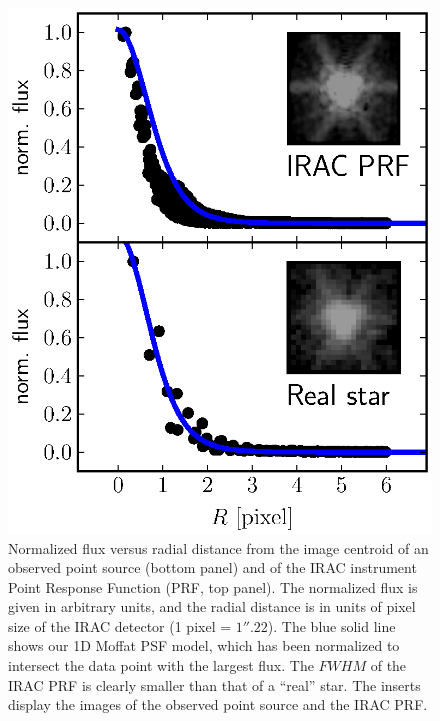 \documentclass[preprint2]{emulateapj}
\begin{document}
\begin{figure}[h]
\begin{center}
\includegraphics[width=1\columnwidth, trim = 240 40 50 20, clip=True]{images/psf.eps}
\caption{Normalized flux versus radial distance 
from the image centroid of an observed point source (bottom panel) 
and of the IRAC instrument Point Response Function (PRF, top panel). 
The normalized flux is given in arbitrary units, 
and the radial distance is in units of pixel size of the IRAC detector (1 pixel = $1''.22$).
The blue solid line shows our 1D Moffat PSF model,
which has been normalized to intersect the data point with the largest flux. 
The $FWHM$ of the IRAC PRF is clearly smaller than that of a ``real'' star.
The inserts display the images of the observed point source and the IRAC PRF.}
\label{fig:psf}
\end{center}
\end{figure}
\end{document}

